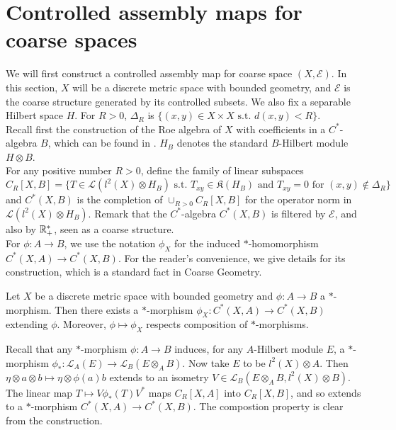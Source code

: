 \section{Controlled assembly maps for coarse spaces}

We will first construct a controlled assembly map for coarse space $(X,\mathcal E)$. In this section, $X$ will be a discrete metric space with bounded geometry, and $\mathcal E$ is the coarse structure generated by its controlled subsets. We also fix a separable Hilbert space $H$. For $R>0$, $\Delta_R$ is $\{(x,y)\in X\times X\text{ s.t. }d(x,y)<R\}$.\\

Recall first the construction of the Roe algebra of $X$ with coefficients in a $C^*$-algebra $B$, which can be found in \cite{SkTuYu}. $H_B$ denotes the standard $B$-Hilbert module $H\otimes B$.\\

For any positive number $R>0$, define the family of linear subspaces 
\[C_R[X,B]=\{T\in \mathcal L(l^2(X)\otimes H_B) \text{ s.t. } T_{xy}\in \mathfrak K(H_B) \text{ and }T_{xy}=0 \text{ for }(x,y)\not\in \Delta_R  \}\]
and $C^*(X,B)$ is the completion of $\cup_{R>0} C_R[X,B]$ for the operator norm in $\mathcal L(l^2(X)\otimes H_B) $. Remark that the $C^*$-algebra $C^*(X,B)$ is filtered by $\mathcal E$, and also by $\mathbb R_+^*$, seen as a coarse structure.\\

For $\phi : A\rightarrow B$, we use the notation $\phi_X $ for the induced $*$-homomorphism $C^*(X,A)\rightarrow C^*(X,B)$. For the reader's convenience, we give details for its construction, which is a standard fact in Coarse Geometry.

\begin{thm}
Let $X$ be a discrete metric space with bounded geometry and $\phi : A\rightarrow B$ a $*$-morphism. Then there exists a $*$-morphism $\phi_X : C^*(X,A)\rightarrow C^*(X,B)$ extending $\phi$. Moreover, $\phi\mapsto \phi_X$ respects composition of $*$-morphisms.
\end{thm}

\begin{dem}
Recall that any $*$-morphism $\phi : A\rightarrow B$ induces, for any $A$-Hilbert module $E$, a $*$-morphism $\phi_* : \mathcal L_A(E)\rightarrow \mathcal L_B(E\otimes_A B)$. Now take $E$ to be $l^2(X)\otimes A$. Then $\eta\otimes a\otimes b\mapsto \eta \otimes\phi(a) b $ extends to an isometry $V\in \mathcal L_B(E\otimes_A B,l^2(X)\otimes B)$.\\
The linear map $T \mapsto V\phi_*(T)V^*$ maps $C_R[X,A]$ into $C_R[X,B]$, and so extends to a $*$-morphism $C^*(X,A)\rightarrow C^*(X,B)$. The compostion property is clear from the construction.
\end{dem}

